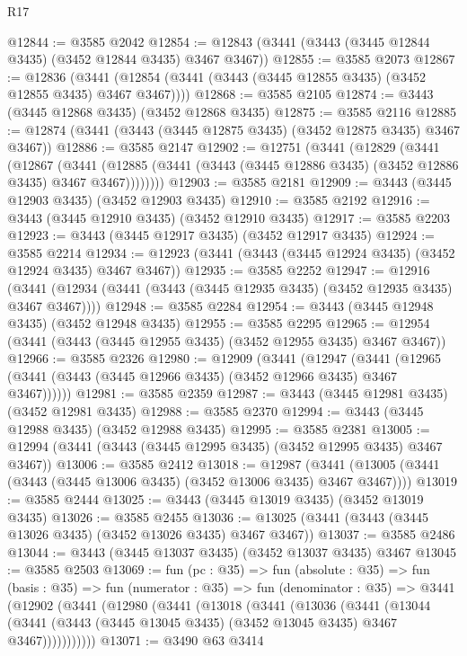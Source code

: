 \begin{lexlean}{R17}
\begin{coremodule}
@12844 := @3585 @2042
@12854 := @12843 (@3441 (@3443 (@3445 @12844 @3435) (@3452 @12844 @3435) @3467 @3467))
@12855 := @3585 @2073
@12867 := @12836
    (@3441 (@12854 (@3441 (@3443 (@3445 @12855 @3435) (@3452 @12855 @3435) @3467 @3467))))
@12868 := @3585 @2105
@12874 := @3443 (@3445 @12868 @3435) (@3452 @12868 @3435)
@12875 := @3585 @2116
@12885 := @12874 (@3441 (@3443 (@3445 @12875 @3435) (@3452 @12875 @3435) @3467 @3467))
@12886 := @3585 @2147
@12902 := @12751
    (@3441
      (@12829
        (@3441
          (@12867
            (@3441
              (@12885 (@3441 (@3443 (@3445 @12886 @3435) (@3452 @12886 @3435) @3467 @3467))))))))
@12903 := @3585 @2181
@12909 := @3443 (@3445 @12903 @3435) (@3452 @12903 @3435)
@12910 := @3585 @2192
@12916 := @3443 (@3445 @12910 @3435) (@3452 @12910 @3435)
@12917 := @3585 @2203
@12923 := @3443 (@3445 @12917 @3435) (@3452 @12917 @3435)
@12924 := @3585 @2214
@12934 := @12923 (@3441 (@3443 (@3445 @12924 @3435) (@3452 @12924 @3435) @3467 @3467))
@12935 := @3585 @2252
@12947 := @12916
    (@3441 (@12934 (@3441 (@3443 (@3445 @12935 @3435) (@3452 @12935 @3435) @3467 @3467))))
@12948 := @3585 @2284
@12954 := @3443 (@3445 @12948 @3435) (@3452 @12948 @3435)
@12955 := @3585 @2295
@12965 := @12954 (@3441 (@3443 (@3445 @12955 @3435) (@3452 @12955 @3435) @3467 @3467))
@12966 := @3585 @2326
@12980 := @12909
    (@3441
      (@12947
        (@3441 (@12965 (@3441 (@3443 (@3445 @12966 @3435) (@3452 @12966 @3435) @3467 @3467))))))
@12981 := @3585 @2359
@12987 := @3443 (@3445 @12981 @3435) (@3452 @12981 @3435)
@12988 := @3585 @2370
@12994 := @3443 (@3445 @12988 @3435) (@3452 @12988 @3435)
@12995 := @3585 @2381
@13005 := @12994 (@3441 (@3443 (@3445 @12995 @3435) (@3452 @12995 @3435) @3467 @3467))
@13006 := @3585 @2412
@13018 := @12987
    (@3441 (@13005 (@3441 (@3443 (@3445 @13006 @3435) (@3452 @13006 @3435) @3467 @3467))))
@13019 := @3585 @2444
@13025 := @3443 (@3445 @13019 @3435) (@3452 @13019 @3435)
@13026 := @3585 @2455
@13036 := @13025 (@3441 (@3443 (@3445 @13026 @3435) (@3452 @13026 @3435) @3467 @3467))
@13037 := @3585 @2486
@13044 := @3443 (@3445 @13037 @3435) (@3452 @13037 @3435) @3467
@13045 := @3585 @2503
@13069 := fun (pc : @35) =>
  fun (absolute : @35) =>
  fun (basis : @35) =>
  fun (numerator : @35) =>
  fun (denominator : @35) =>
  @3441
    (@12902
      (@3441
        (@12980
          (@3441
            (@13018
              (@3441
                (@13036
                  (@3441
                    (@13044
                      (@3441 (@3443 (@3445 @13045 @3435) (@3452 @13045 @3435) @3467 @3467)))))))))))
@13071 := @3490 @63 @3414

\end{coremodule}
\end{lexlean}
